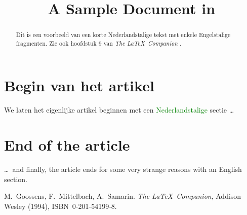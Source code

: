 \documentclass[a5paper,11pt]{article}
\title{A Sample Document in \LaTeXe}
\date{}
\begin{document}
\maketitle
\begin{abstract}
Dit is een voorbeeld van een korte Nederlandstalige tekst met
enkele Engelstalige fragmenten. Zie ook hoofdstuk 9 van
\emph{The \LaTeX\ Companion} \cite{GMS94}.
\end{abstract}
\tableofcontents
\section{Begin van het artikel}
We laten het eigenlijke artikel beginnen met een
\textcolor{green}{Nederlandstalige} sectie \ldots
{} %
\section{End of the article}
\ldots\ and finally, the article ends for some very
strange reasons with an English section.
\begin{thebibliography}{99}
M.~Goossens, F.~Mittelbach, A.~Samarin. \emph{The \LaTeX\ Companion},
Addison-Wesley (1994), ISBN~0-201-54199-8.
\end{thebibliography}
\end{document}
